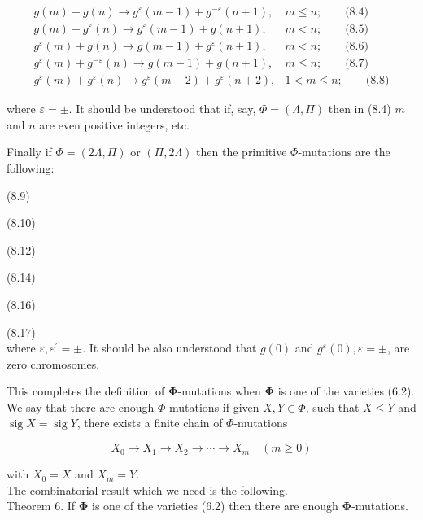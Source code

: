 \documentclass[10pt]{article}
\begin{document}
$$
\begin{array}{cc}
g(m)+g(n) \rightarrow g^{\varepsilon}(m-1)+g^{-\varepsilon}(n+1), & m \leqslant n ; \qquad\text{(8.4)} \\
g(m)+g^{\varepsilon}(n) \rightarrow g^{\varepsilon}(m-1)+g(n+1), & m<n ; \qquad\text{(8.5)} \\
g^{\varepsilon}(m)+g(n) \rightarrow g(m-1)+g^{\varepsilon}(n+1), & m<n ; \qquad\text{(8.6)} \\
g^{\varepsilon}(m)+g^{-\varepsilon}(n) \rightarrow g(m-1)+g(n+1), & m \leqslant n ; \qquad\text{(8.7)} \\
g^{\varepsilon}(m)+g^{\varepsilon}(n) \rightarrow g^{\varepsilon}(m-2)+g^{\varepsilon}(n+2), & 1<m \leqslant n ; \qquad\text{(8.8)}
\end{array}
$$

where $\varepsilon= \pm$. It should be understood that if, say, $\Phi=(\Lambda, \Pi)$ then in (8.4) $m$ and $n$ are even positive integers, etc.

Finally if $\Phi=(2 \Lambda, \Pi)$ or $(\Pi, 2 \Lambda)$ then the primitive $\Phi$-mutations are the following:

(8.9)

(8.10)

(8.12)

(8.14)

(8.16)

(8.17)\\
where $\varepsilon, \varepsilon^{\prime}= \pm$. It should be also understood that $g(0)$ and $g^{\varepsilon}(0), \varepsilon= \pm$, are zero chromosomes.

This completes the definition of $\boldsymbol{\Phi}$-mutations when $\boldsymbol{\Phi}$ is one of the varieties (6.2).\\
We say that there are enough $\Phi$-mutations if given $X, Y \in \Phi$, such that $X \leqslant Y$ and $\operatorname{sig} X=\operatorname{sig} Y$, there exists a finite chain of $\Phi$-mutations

$$
X_{0} \rightarrow X_{1} \rightarrow X_{2} \rightarrow \cdots \rightarrow X_{m} \quad(m \geqslant 0)
$$

with $X_{0}=X$ and $X_{m}=Y$.\\
The combinatorial result which we need is the following.\\
Theorem 6. If $\boldsymbol{\Phi}$ is one of the varieties (6.2) then there are enough $\boldsymbol{\Phi}$-mutations.
\end{document}

